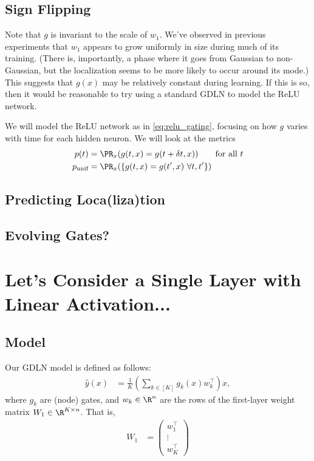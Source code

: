\documentclass{article}
\begin{document}
\subsection{Sign Flipping}

Note that $g$ is invariant to the scale of $w_1$.
We've observed in previous experiments that $w_1$ appears to grow uniformly in size during much of its training.
(There is, importantly, a phase where it goes from Gaussian to non-Gaussian, but the localization seems to be more likely to occur around its mode.)
This suggests that $g(x)$ may be relatively constant during learning.
If this is so, then it would be reasonable to try using a standard GDLN to model the ReLU network.

We will model the ReLU network as in \cref{eq:relu_gating}, focusing on how $g$ varies with time for each hidden neuron.
We will look at the metrics
\begin{align}
  p(t) &= \PR_x( g(t, x) = g(t + \delta t, x) ) \qquad \text{for all $t$} \\
  p_{\text{unif}} &= \PR_x( \{ g(t, x) = g(t', x) \ \forall t,t' \} )
\end{align}




\subsection{Predicting Loca(liza)tion}

\subsection{Evolving Gates?}


\section{Let's Consider a Single Layer with Linear Activation...}

\subsection{Model}
Our GDLN model is defined as follows:
\begin{align}
  \hat{y}(x) &= \frac{1}{K} \left( \sum_{k \in [K]} g_k(x) w_k^\top \right) x, \label{eq:gdln_model}
\end{align}
where $g_k$ are (node) gates, and $w_k \in \R^n$ are the rows of the first-layer weight matrix $W_1 \in \R^{K \times n}$.
That is,
\begin{align}
  W_1 &= \begin{pmatrix} w_1^\top \\ \vdots \\ w_K^\top \end{pmatrix}
\end{align}
\end{document}
